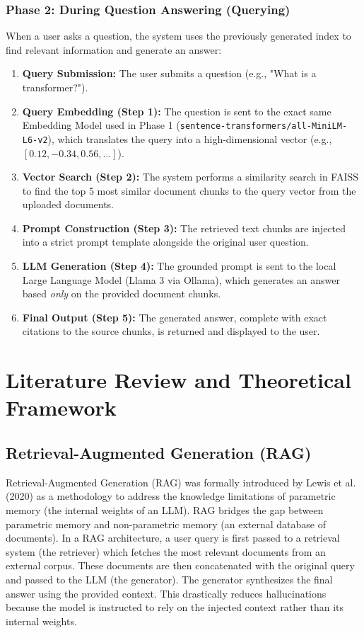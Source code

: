 \documentclass[12pt, a4paper]{report}
\begin{document}
\subsection{Phase 2: During Question Answering (Querying)}
When a user asks a question, the system uses the previously generated index to find relevant information and generate an answer:
\begin{enumerate}
    \item \textbf{Query Submission:} The user submits a question (e.g., "What is a transformer?").
    \item \textbf{Query Embedding (Step 1):} The question is sent to the exact same Embedding Model used in Phase 1 (\texttt{sentence-transformers/all-MiniLM-L6-v2}), which translates the query into a high-dimensional vector (e.g., $[0.12, -0.34, 0.56, \dots]$).
    \item \textbf{Vector Search (Step 2):} The system performs a similarity search in FAISS to find the top 5 most similar document chunks to the query vector from the uploaded documents.
    \item \textbf{Prompt Construction (Step 3):} The retrieved text chunks are injected into a strict prompt template alongside the original user question.
    \item \textbf{LLM Generation (Step 4):} The grounded prompt is sent to the local Large Language Model (Llama 3 via Ollama), which generates an answer based \textit{only} on the provided document chunks.
    \item \textbf{Final Output (Step 5):} The generated answer, complete with exact citations to the source chunks, is returned and displayed to the user.
\end{enumerate}


\chapter{Literature Review and Theoretical Framework}

\section{Retrieval-Augmented Generation (RAG)}
Retrieval-Augmented Generation (RAG) was formally introduced by Lewis et al. (2020) as a methodology to address the knowledge limitations of parametric memory (the internal weights of an LLM). RAG bridges the gap between parametric memory and non-parametric memory (an external database of documents). In a RAG architecture, a user query is first passed to a retrieval system (the retriever) which fetches the most relevant documents from an external corpus. These documents are then concatenated with the original query and passed to the LLM (the generator). The generator synthesizes the final answer using the provided context. This drastically reduces hallucinations because the model is instructed to rely on the injected context rather than its internal weights.
\end{document}
